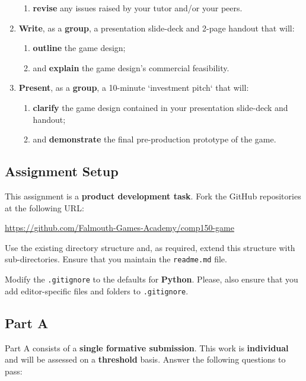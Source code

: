 \documentclass{../fal_assignment}
\begin{document}
\begin{enumerate}[label=(\Alph*)]
\begin{enumerate}[label=\roman*.]
    		\item \textbf{revise} any issues raised by your tutor and/or your peers.
	\end{enumerate}
    \item \textbf{Write}, as a \textbf{group}, a presentation slide-deck and 2-page handout that will:
    	\begin{enumerate}[label=\roman*.]
    		\item \textbf{outline} the game design;
    		\item and \textbf{explain} the game design's commercial feasibility.
	\end{enumerate}
    \item \textbf{Present}, as a \textbf{group}, a 10-minute `investment pitch` that will:
    	\begin{enumerate}[label=\roman*.]
    		\item \textbf{clarify} the game design contained in your presentation slide-deck and handout;
    		\item and \textbf{demonstrate} the final pre-production prototype of the game.
	\end{enumerate}
\end{enumerate}

\subsection*{Assignment Setup}

This assignment is a \textbf{product development task}. Fork the GitHub repositories at the following URL:

\indent \url{https://github.com/Falmouth-Games-Academy/comp150-game}

Use the existing directory structure and, as required, extend this structure with sub-directories. Ensure that you maintain the \texttt{readme.md} file.

Modify the \texttt{.gitignore} to the defaults for \textbf{Python}. Please, also ensure that you add editor-specific files and folders to \texttt{.gitignore}. 

\subsection*{Part A}

Part A consists of a \textbf{single formative submission}. This work is \textbf{individual} and will be assessed on a \textbf{threshold} basis. Answer the following questions to pass:
\end{document}
